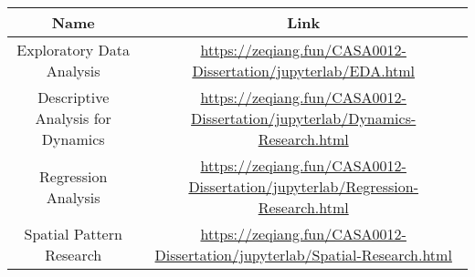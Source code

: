 \documentclass[
  12pt,
  oneside]{book}
\begin{document}
\begin{longtable}[]{@{}cc@{}}
\toprule
\begin{minipage}[b]{0.47\columnwidth}\centering
Name\strut
\end{minipage} & \begin{minipage}[b]{0.47\columnwidth}\centering
Link\strut
\end{minipage}\tabularnewline
\midrule
\endhead
\begin{minipage}[t]{0.47\columnwidth}\centering
Exploratory Data Analysis\strut
\end{minipage} & \begin{minipage}[t]{0.47\columnwidth}\centering
\url{https://zeqiang.fun/CASA0012-Dissertation/jupyterlab/EDA.html}\strut
\end{minipage}\tabularnewline
\begin{minipage}[t]{0.47\columnwidth}\centering
Descriptive Analysis for Dynamics\strut
\end{minipage} & \begin{minipage}[t]{0.47\columnwidth}\centering
\url{https://zeqiang.fun/CASA0012-Dissertation/jupyterlab/Dynamics-Research.html}\strut
\end{minipage}\tabularnewline
\begin{minipage}[t]{0.47\columnwidth}\centering
Regression Analysis\strut
\end{minipage} & \begin{minipage}[t]{0.47\columnwidth}\centering
\url{https://zeqiang.fun/CASA0012-Dissertation/jupyterlab/Regression-Research.html}\strut
\end{minipage}\tabularnewline
\begin{minipage}[t]{0.47\columnwidth}\centering
Spatial Pattern Research\strut
\end{minipage} & \begin{minipage}[t]{0.47\columnwidth}\centering
\url{https://zeqiang.fun/CASA0012-Dissertation/jupyterlab/Spatial-Research.html}\strut
\end{minipage}\tabularnewline
\bottomrule
\end{longtable}

\enddocument

\printbibliography
\end{document}
